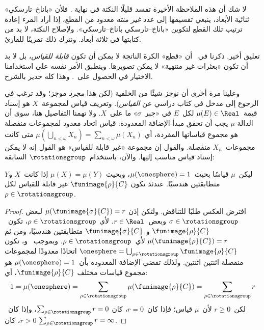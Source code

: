 \documentclass[../../../include/open-logic-section]{subfiles}
\begin{document}
لا شك أن هذه الملاحظة الأخيرة تفسد قليلًا النكتة في نهاية
. فلأن «باناخ--تارسكي» ثنائية الأبعاد، ينبغي
تقسيمها إلى عدد \emph{غير منته} معدود من القطع، إذا أراد المرء إعادة
ترتيب تلك القطع لتكوين «باناخ--تارسكي باناخ--تارسكي». ولإصلاح
النكتة، لا بد من كتابتها في ثلاثة أبعاد. ونترك ذلك تمرينًا للقارئ.

تعليق أخير. ذكرنا في~ أن «قطع» الكرة الناتجة لا
يمكن أن تكون \emph{قابلة للقياس}، بل لا بد أن تكون «بعثرات غير
منتهية» لا يمكن تصويرها. وينطبق الأمر نفسه على استخدامنا الاختيار في
الحصول على~. وهذا كله جدير بالشرح.

وعلينا مرة أخرى أن نوجز شيئًا من الخلفية (لكن هذا \emph{مجرد} موجز؛
وقد ترغب في الرجوع إلى مدخل في كتاب دراسي عن \emph{القياس}). وتعريف
قياس لمجموعة~$X$ هو إسناد قيمة~$\mu(E) \in \Real$ لكل~$E$ في
«جبر~$\sigma$» ما على~$X$. ولا تهمنا التفاصيل هنا، سوى أن الدالة
$\mu$ يجب أن تحقق مبدأ الإضافة المعدودة: قياس اتحاد معدود لمجموعات
منفصلة هو مجموع قياساتها المفردة، أي
$\mu(\bigcup_{n < \omega} X_n) = \sum_{n < \omega}\mu(X_n)$ متى كانت
مجموعات~$X_n$ منفصلة. والقول إن مجموعة «غير قابلة للقياس» هو القول
إنه لا يمكن إسناد قياس مناسب إليها. والآن، باستخدام~$\rotationsgroup$
السابقة:

\begin{cor}[فيتالي]
ليكن~$\mu$ قياسًا بحيث~$\mu(\onesphere) = 1$، وبحيث
$\mu(X) = \mu(Y)$ إذا كانت~$X$ و$Y$ متطابقتين هندسيًا. عندئذ تكون
$\funimage{\rho}{C}$ غير قابلة للقياس لكل
$\rho \in \rotationsgroup$.
\end{cor}

\begin{proof}
افترض العكس طلبًا للتناقض. ولتكن إذن
$\mu(\funimage{\sigma}{C}) = r$ لبعض
$\sigma \in \rotationsgroup$ وبعض~$r \in \Real$. لأي
$\rho \in \rotationsgroup$، تكون~$\funimage{\rho}{C}$ و
$\funimage{\sigma}{C}$ متطابقتين هندسيًا، ومن ثم
$\mu(\funimage{\rho}{C}) = r$ لأي~$\rho \in \rotationsgroup$.
وبموجب~ و، تكون
$\onesphere =
\bigcup_{\rho \in \rotationsgroup}\funimage{\rho}{C}$ اتحادًا
معدودًا لمجموعات منفصلة اثنتين اثنتين. ولذلك تقضي الإضافة المعدودة
بأن~$\mu(\onesphere) = 1$ هو مجموع قياسات مختلف
$\funimage{\rho}{C}$، أي:
\[
	1 = \mu(\onesphere) = \sum_{\rho \in \rotationsgroup}\mu(\funimage{\rho}{C}) = \sum_{\rho \in \rotationsgroup}r
\]
لكن~$r \geq 0$ لأن~$\mu$ قياس؛ فإذا كان~$r = 0$، كان
$\sum_{\rho \in \rotationsgroup}r = 0$، وإذا كان~$r > 0$، كان
$\sum_{\rho \in \rotationsgroup}r = \infty$.
\end{proof}
\end{document}
